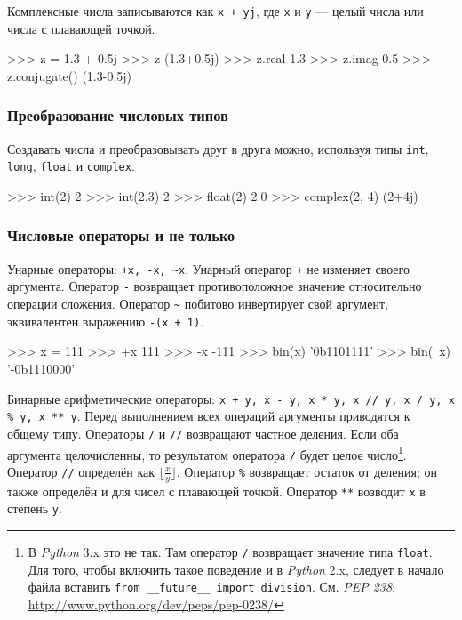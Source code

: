 Комплексные числа записываются как \lstinline{x + yj}, где \lstinline{x} и \lstinline{y} — целый числа или числа с плавающей точкой.

\begin{pylst}{}{}
>>> z = 1.3 + 0.5j
>>> z
(1.3+0.5j)
>>> z.real
1.3
>>> z.imag
0.5
>>> z.conjugate()
(1.3-0.5j)
\end{pylst}

\subsubsection{Преобразование числовых типов}

Создавать числа и преобразовывать друг в друга можно, используя типы \lstinline{int}, \lstinline{long}, \lstinline{float} и \lstinline{complex}.

\begin{pylst}{}{}
>>> int(2)
2
>>> int(2.3)
2
>>> float(2)
2.0
>>> complex(2, 4)
(2+4j)
\end{pylst}

\subsubsection{Числовые операторы и не только}

Унарные операторы: \lstinline{+x, -x, ~x}. Унарный оператор \lstinline{+} не изменяет своего аргумента. Оператор \lstinline{-} возвращает противоположное значение относительно операции сложения. Оператор \lstinline{~} побитово инвертирует свой аргумент, эквивалентен выражению \lstinline{-(x + 1)}.

\begin{pylst}{}{}
>>> x = 111
>>> +x
111
>>> -x
-111
>>> bin(x)
'0b1101111'
>>> bin(~x)
'-0b1110000'
\end{pylst}

Бинарные арифметические операторы: \lstinline{x + y, x - y, x * y, x // y, x / y, x % y, x ** y}. Перед выполнением всех операций аргументы приводятся к общему типу. Операторы \lstinline{/} и \lstinline{//} возвращают частное деления. Если оба аргумента целочисленны, то результатом оператора \lstinline{/} будет целое число\footnote{В \emph{Python} 3.x это не так. Там оператор \lstinline{/} возвращает значение типа \lstinline{float}. Для того, чтобы включить такое поведение и в \emph{Python} 2.x, следует в начало файла вставить \lstinline{from __future__ import division}. См. \emph{PEP 238}: \url{http://www.python.org/dev/peps/pep-0238/}}. Оператор \lstinline{//} определён как $\lfloor \frac{x}{y} \rfloor$. Оператор \lstinline{%} возвращает остаток от деления; он также определён и для чисел с плавающей точкой. Оператор \lstinline{**} возводит \lstinline{x} в степень \lstinline{y}.

